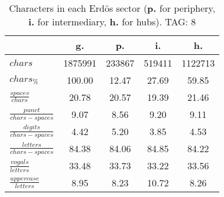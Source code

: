 \begin{table}[h!]
\begin{center}
\begin{tabular}{| l | c | c | c | c |}\hline
 & g. & p. & i. & h. \\\hline
$chars$ & 1875991  & 233867  & 519411  & 1122713 \\\hline
$chars_{\%}$ & 100.00  & 12.47  & 27.69  & 59.85 \\\hline
$\frac{spaces}{chars}$ & 20.78  & 20.57  & 19.39  & 21.46 \\\hline
$\frac{punct}{chars-spaces}$ & 9.07  & 8.56  & 9.20  & 9.11 \\\hline
$\frac{digits}{chars-spaces}$ & 4.42  & 5.20  & 3.85  & 4.53 \\\hline
$\frac{letters}{chars-spaces}$ & 84.38  & 84.06  & 84.85  & 84.22 \\\hline
$\frac{vogals}{letters}$ & 33.48  & 33.73  & 33.22  & 33.56 \\\hline
$\frac{uppercase}{letters}$ & 8.95  & 8.23  & 10.72  & 8.26 \\\hline
\end{tabular}
\caption{Characters in each Erd\"os sector ({{\bf p.}} for periphery, {{\bf i.}} for intermediary, 
    {{\bf h.}} for hubs). TAG: 8}
\end{center}
\end{table}